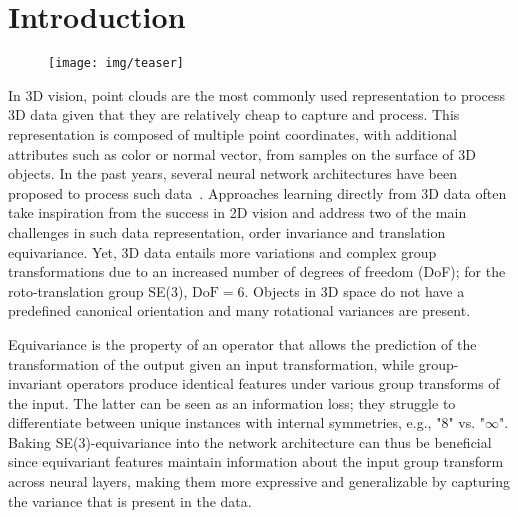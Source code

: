\section{Introduction}
\label{sec:intro}


\begin{figure}[t]
  \centering
    \texttt{[image: img/teaser]}

  \label{fig:teaser}
\end{figure}


In 3D vision, point clouds are the most commonly used representation to process 3D data given that they are relatively cheap to capture and process. This representation is composed of multiple point coordinates, with additional attributes such as color or normal vector, from samples on the surface of 3D objects.
In the past years, several neural network architectures have been proposed to process such data~\cite{qi2017pointnet,atzmon2018pccnn,thomas2019KPConv,boulch2020convpoint,hermosilla2018mccnn,wu2019pointconv}.
Approaches learning directly from 3D data often take inspiration from the success in 2D vision and address two of the main challenges in such data representation, order invariance and translation equivariance. Yet, 3D data entails more variations and complex group transformations due to an increased number of degrees of freedom (DoF); for the roto-translation group SE(3), $\text{DoF}=6$. Objects in 3D space do not have a predefined canonical orientation and many rotational variances are present. 

Equivariance is the property of an operator that allows the prediction of the transformation of the output given an input transformation, while group-invariant operators produce identical features under various group transforms of the input. The latter can be seen as an information loss; they struggle to differentiate between unique instances with internal symmetries, e.g., "$8$" vs. "$\infty$". Baking SE(3)-equivariance into the network architecture can thus be beneficial since equivariant features maintain information about the input group transform across neural layers, making them more expressive and generalizable by capturing the variance that is present in the data. 

